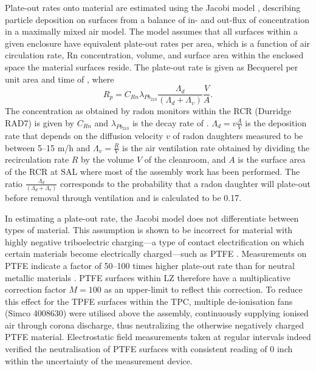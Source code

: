 Plate-out rates onto material are estimated using the Jacobi model \cite{jacobi1972activity, knutson1988modeling}, describing particle deposition on surfaces from a balance of in- and out-flux of concentration in a maximally mixed air model. The model assumes that all surfaces within a given enclosure have equivalent plate-out rates per area, which is a function of air circulation rate, Rn concentration, volume, and surface area within the enclosed space the material surfaces reside. The plate-out rate is given as Becquerel per unit area and time of \PbTOZ{}, where
%
\begin{equation}
    R_p=C_{Rn}\lambda_{Pb_{210}}\frac{\Lambda_d}{(\Lambda_d +\Lambda_v)}\frac{V}{A}.
    \label{eq:jacobi_eq}
\end{equation}
%
The \RnTTT{} concentration as obtained by radon monitors within the RCR (Durridge RAD7) is given by ${C_{Rn}}$ and ${\lambda_{Pb_{210}}}$ is the decay rate of \PbTOZ{}. ${{\Lambda_d =v\frac{A}{V}}}$ is the deposition rate that depends on the diffusion velocity $v$ of radon daughters measured to be between 5--15 m/h \cite{knutson1988modeling} and ${{\Lambda_v = \frac{R}{V}}}$ is the air ventilation rate obtained by dividing the recirculation rate $R$ by the volume $V$ of the cleanroom, and $A$ is the surface area of the RCR at SAL where most of the assembly work has been performed. The ratio ${\frac{\Lambda_d}{(\Lambda_d +\Lambda_v)}}$ corresponds to the probability that a radon daughter will plate-out before removal through ventilation and is calculated to be 0.17.

In estimating a plate-out rate, the Jacobi model does not differentiate between types of material. This assumption is shown to be incorrect for material with highly negative triboelectric charging---a type of contact electrification on which certain materials become electrically charged---such as PTFE \cite{zou:2019tde}. Measurements on PTFE indicate a factor of 50--100 times higher plate-out rate than for neutral metallic materials \cite{Morrison:2017xul}. PTFE surfaces within LZ therefore have a multiplicative correction factor ${M=100}$ as an upper-limit to reflect this correction. To reduce this effect for the TPFE surfaces within the TPC, multiple de-ionisation fans (Simco 4008630) were utilised above the assembly, continuously supplying ionised air through corona discharge, thus neutralizing the otherwise negatively charged PTFE material. Electrostatic field measurements taken at regular intervals indeed verified the neutralisation of PTFE surfaces with consistent reading of 0 \kilo\volt\per{}inch within the uncertainty of the measurement device.

